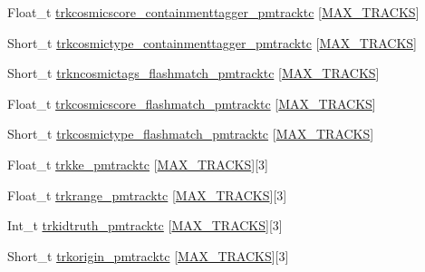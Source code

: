 \begin{DoxyCompactItemize}
\item 
Float\-\_\-t \hyperlink{classanatree_a86eb981b40ae60da0c439947b4a011c2}{trkcosmicscore\-\_\-containmenttagger\-\_\-pmtracktc} \mbox{[}\hyperlink{anatree__core__v09410002__orig_8h_a327fd4e796e4a0d78947524c96e4362e}{M\-A\-X\-\_\-\-T\-R\-A\-C\-K\-S}\mbox{]}
\item 
Short\-\_\-t \hyperlink{classanatree_abc3c285943f8c1e728b1322d3a2fd6ea}{trkcosmictype\-\_\-containmenttagger\-\_\-pmtracktc} \mbox{[}\hyperlink{anatree__core__v09410002__orig_8h_a327fd4e796e4a0d78947524c96e4362e}{M\-A\-X\-\_\-\-T\-R\-A\-C\-K\-S}\mbox{]}
\item 
Short\-\_\-t \hyperlink{classanatree_a9ae23552b9c97855a48975455d5919dd}{trkncosmictags\-\_\-flashmatch\-\_\-pmtracktc} \mbox{[}\hyperlink{anatree__core__v09410002__orig_8h_a327fd4e796e4a0d78947524c96e4362e}{M\-A\-X\-\_\-\-T\-R\-A\-C\-K\-S}\mbox{]}
\item 
Float\-\_\-t \hyperlink{classanatree_a186931ceae13970e98a9e0c5abac3b79}{trkcosmicscore\-\_\-flashmatch\-\_\-pmtracktc} \mbox{[}\hyperlink{anatree__core__v09410002__orig_8h_a327fd4e796e4a0d78947524c96e4362e}{M\-A\-X\-\_\-\-T\-R\-A\-C\-K\-S}\mbox{]}
\item 
Short\-\_\-t \hyperlink{classanatree_a1434a7f0ee354b1d1ab19a4e938f833f}{trkcosmictype\-\_\-flashmatch\-\_\-pmtracktc} \mbox{[}\hyperlink{anatree__core__v09410002__orig_8h_a327fd4e796e4a0d78947524c96e4362e}{M\-A\-X\-\_\-\-T\-R\-A\-C\-K\-S}\mbox{]}
\item 
Float\-\_\-t \hyperlink{classanatree_af0afdb9e534b9cf7d849ae2649367e5a}{trkke\-\_\-pmtracktc} \mbox{[}\hyperlink{anatree__core__v09410002__orig_8h_a327fd4e796e4a0d78947524c96e4362e}{M\-A\-X\-\_\-\-T\-R\-A\-C\-K\-S}\mbox{]}\mbox{[}3\mbox{]}
\item 
Float\-\_\-t \hyperlink{classanatree_af42f7a01fa5915855e38ba562699f4b3}{trkrange\-\_\-pmtracktc} \mbox{[}\hyperlink{anatree__core__v09410002__orig_8h_a327fd4e796e4a0d78947524c96e4362e}{M\-A\-X\-\_\-\-T\-R\-A\-C\-K\-S}\mbox{]}\mbox{[}3\mbox{]}
\item 
Int\-\_\-t \hyperlink{classanatree_a909a4bd609aeb07b38c5349d249d6c3d}{trkidtruth\-\_\-pmtracktc} \mbox{[}\hyperlink{anatree__core__v09410002__orig_8h_a327fd4e796e4a0d78947524c96e4362e}{M\-A\-X\-\_\-\-T\-R\-A\-C\-K\-S}\mbox{]}\mbox{[}3\mbox{]}
\item 
Short\-\_\-t \hyperlink{classanatree_a700d7d60e968a6971cd4e071b432a89e}{trkorigin\-\_\-pmtracktc} \mbox{[}\hyperlink{anatree__core__v09410002__orig_8h_a327fd4e796e4a0d78947524c96e4362e}{M\-A\-X\-\_\-\-T\-R\-A\-C\-K\-S}\mbox{]}\mbox{[}3\mbox{]}

\end{DoxyCompactItemize}
